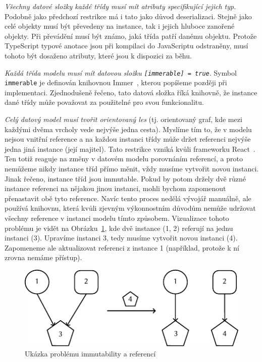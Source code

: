 \emph{Všechny datové složky každé třídy musí mít atributy specifikující jejich typ}.
Podobně jako předchozí restrikce má i tato jako důvod deserializaci.
Stejně jako celé objekty musí být převedeny na instance, tak i jejich hluboce zanořené objekty.
Při převádění musí být známo, jaká třída patří danému objektu.
Protože TypeScript typové anotace jsou při kompilaci do JavaScriptu odstraněny, musí tohoto být dosaženo atributy, které jsou k dispozici za běhu.

\emph{Každá třída modelu musí mít datovou složku \texttt{[immerable] = true}}.
Symbol \texttt{immerable} je definován knihovnou Immer~\cite{michelweststrate_immer_2023}, kterou popíšeme později při implementaci.
Zjednodušeně řečeno, tato datová složka říká knihovně, že instance dané třídy může považovat za použitelné pro svou funkcionalitu.

\emph{Celý datový model musí tvořit orientovaný les} (tj. orientovaný graf, kde mezi každými dvěma vrcholy vede nejvýše jedna cesta).
Myslíme tím to, že v modelu nejsou vnitřní reference a na každou instanci třídy může držet referenci nejvýše jedna jiná instance (její majitel).
Tato restrikce vzniká kvůli frameworku React~\cite{react_2023}.
Ten totiž reaguje na změny v datovém modelu porovnáním referencí, a proto nemůžeme nikdy instance tříd přímo měnit, vždy musíme vytvořit novou instanci.
Jinak řečeno, instance tříd jsou immutable.
Pokud by potom držely dvě různé instance referenci na nějakou jinou instanci, mohli bychom zapomenout přenastavit obě tyto reference.
Navíc tento proces nedělá vývojář manuálně, ale používá knihovnu, která kvůli zjevným výkonnostním důvodům nemůže udržovat všechny reference v instanci modelu tímto způsobem.
Vizualizace tohoto problému je vidět na Obrázku~\ref{fig:immutability-references}, kde dvě instance (1, 2) referují na jednu instanci (3).
Upravíme instanci 3, tedy musíme vytvořit novou instanci (4).
Zapomeneme ale aktualizovat referenci z instance 1 (například, protože k ní zrovna nemáme přístup).

\begin{figure}[!htb]
  \centering
  \includegraphics[width=\maxwidth{\textwidth}]{../img/react-references.pdf}
  \caption{Ukázka problému immutability a referencí}
  \label{fig:immutability-references}
\end{figure}


